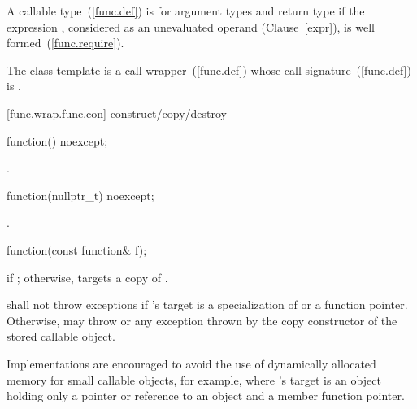 \pnum
{}%
A callable type~(\ref{func.def}) 
is  for argument
types 
and return type 
if the expression
,
considered as an unevaluated operand (Clause~\ref{expr}), is
well formed~(\ref{func.require}).

\pnum
The  class template is a call
wrapper~(\ref{func.def}) whose call signature~(\ref{func.def})
is .

[func.wrap.func.con]{ construct/copy/destroy}

%
\begin{itemdecl}
function() noexcept;
\end{itemdecl}

\begin{itemdescr}
\pnum\postconditions {}.
\end{itemdescr}

%
\begin{itemdecl}
function(nullptr_t) noexcept;
\end{itemdecl}

\begin{itemdescr}
\pnum
\postconditions {}.
\end{itemdescr}

%
\begin{itemdecl}
function(const function& f);
\end{itemdecl}

\begin{itemdescr}
\pnum
\postconditions {} if ; otherwise,
 targets a copy of .

\pnum
\throws shall not throw exceptions if 's target is
a specialization of  or
a function pointer. Otherwise, may throw 
or any exception thrown by the copy constructor of the stored callable object.
\begin{note} Implementations are encouraged to avoid the use of
dynamically allocated memory for small callable objects, for example, where
's target is an object holding only a pointer or reference
to an object and a member function pointer. \end{note}
\end{itemdescr}

